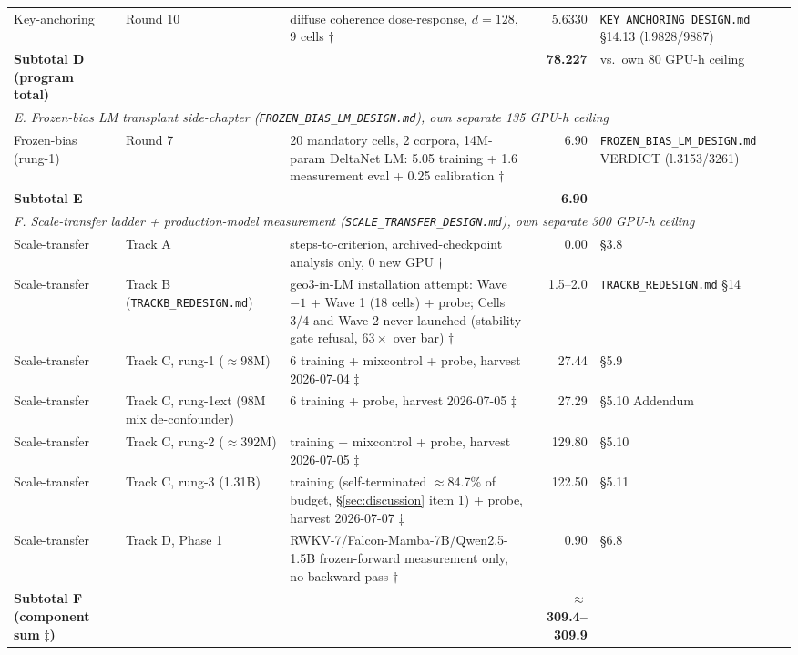 \begin{table}[htbp]
\begin{tabular}{p{3.6cm}p{3.6cm}p{5.6cm}rl}
Key-anchoring & Round 10 & diffuse coherence dose-response, $d{=}128$, 9 cells $\dagger$ & 5.6330 & \texttt{KEY\_ANCHORING\_DESIGN.md} \S14.13 (l.9828/9887) \\
\textbf{Subtotal D (program total)} & & & \textbf{78.227} & vs.\ own 80 GPU-h ceiling \\
\midrule
\multicolumn{5}{l}{\textit{E. Frozen-bias LM transplant side-chapter (\texttt{FROZEN\_BIAS\_LM\_DESIGN.md}), own separate 135 GPU-h ceiling}} \\
Frozen-bias (rung-1) & Round 7 & 20 mandatory cells, 2 corpora, 14M-param DeltaNet LM: 5.05 training + 1.6 measurement eval + 0.25 calibration $\dagger$ & 6.90 & \texttt{FROZEN\_BIAS\_LM\_DESIGN.md} VERDICT (l.3153/3261) \\
\textbf{Subtotal E} & & & \textbf{6.90} & \\
\midrule
\multicolumn{5}{l}{\textit{F. Scale-transfer ladder + production-model measurement (\texttt{SCALE\_TRANSFER\_DESIGN.md}), own separate 300 GPU-h ceiling}} \\
Scale-transfer & Track A & steps-to-criterion, archived-checkpoint analysis only, 0 new GPU $\dagger$ & 0.00 & \S3.8 \\
Scale-transfer & Track B (\texttt{TRACKB\_REDESIGN.md}) & geo3-in-LM installation attempt: Wave $-1$ + Wave 1 (18 cells) + probe; Cells 3/4 and Wave 2 never launched (stability gate refusal, $63\times$ over bar) $\dagger$ & 1.5--2.0 & \texttt{TRACKB\_REDESIGN.md} \S14 \\
Scale-transfer & Track C, rung-1 ($\approx$98M) & 6 training + mixcontrol + probe, harvest 2026-07-04 $\ddagger$ & 27.44 & \S5.9 \\
Scale-transfer & Track C, rung-1ext (98M mix de-confounder) & 6 training + probe, harvest 2026-07-05 $\ddagger$ & 27.29 & \S5.10 Addendum \\
Scale-transfer & Track C, rung-2 ($\approx$392M) & training + mixcontrol + probe, harvest 2026-07-05 $\ddagger$ & 129.80 & \S5.10 \\
Scale-transfer & Track C, rung-3 (1.31B) & training (self-terminated $\approx$84.7\% of budget, \S\ref{sec:discussion} item 1) + probe, harvest 2026-07-07 $\ddagger$ & 122.50 & \S5.11 \\
Scale-transfer & Track D, Phase 1 & RWKV-7/Falcon-Mamba-7B/Qwen2.5-1.5B frozen-forward measurement only, no backward pass $\dagger$ & 0.90 & \S6.8 \\
\textbf{Subtotal F (component sum} $\ddagger$\textbf{)} & & & \textbf{$\approx$309.4--309.9} & \\

\end{tabular}
\end{table}
